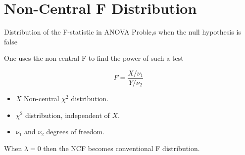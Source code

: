 
\section{Non-Central F Distribution}

Distribution of the F-statistic in ANOVA Proble,s when the null hypothesis is false

One uses the non-central F to find the power of such a test

\[ F = \frac{X/ \nu_1}{Y/\nu_2}\]

\begin{itemize}
\item $X$ Non-central $\chi^2$ distribution.
\item $\chi^2$ distribution, independent of $X$.
\item $\nu_1$ and $\nu_2$ degrees of freedom.
\end{itemize}

When $\lambda=0$ then the NCF becomes conventional F distribution.
